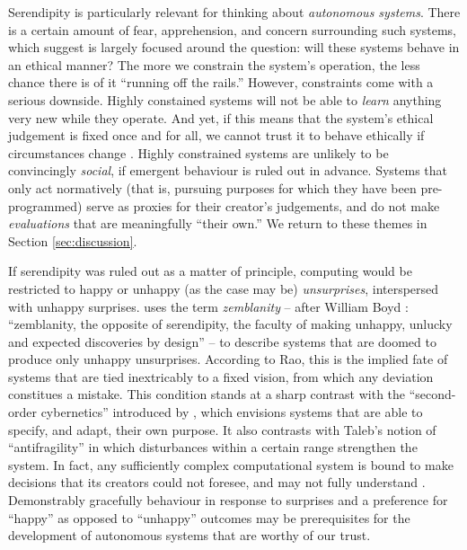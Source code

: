 Serendipity is particularly relevant for thinking about
\emph{autonomous systems}.  There is a certain amount of fear,
apprehension, and concern surrounding such systems, which
 suggest is largely focused around the
question: will these systems behave in an ethical manner?  The more we
constrain the system's operation, the less chance there is of it
``running off the rails.''  However, constraints come with a serious
downside.  Highly constained systems will not be able to \emph{learn}
anything very new while they operate.  And yet, if this means that the
system's ethical judgement is fixed once and for all, we cannot trust
it to behave ethically if circumstances change
\cite{powers2005deontological}.  Highly constrained systems are
unlikely to be convincingly \emph{social}, if emergent behaviour is
ruled out in advance.  Systems that only act normatively (that is,
pursuing purposes for which they have been pre-programmed) serve as
proxies for their creator's judgements, and do not make
\emph{evaluations} that are meaningfully ``their own.''  We return to these themes in Section \ref{sec:discussion}.

If serendipity was ruled out as a matter of principle, computing would
be restricted to happy or unhappy (as the case may be)
\emph{unsurprises}, interspersed with unhappy surprises.
 uses the term \emph{zemblanity} -- after
William Boyd \citeyearpar{boyd2010armadillo}: ``zemblanity, the
opposite of serendipity, the faculty of making unhappy, unlucky and
expected discoveries by design'' -- to describe systems that are
doomed to produce only unhappy unsurprises.  According to Rao,
this is the implied fate of
systems that are tied inextricably to a fixed vision, from which any
deviation constitues a mistake.  This condition stands at a sharp
contrast with the ``second-order cybernetics'' introduced by
, which envisions systems that are able to
specify, and adapt, their own purpose.  It also contrasts with Taleb's
\citeyearpar{taleb2012antifragile} notion of ``antifragility'' in
which disturbances within a certain range strengthen the system.  In
fact, any sufficiently complex computational system is bound to make
decisions that its creators could not foresee, and may not fully
understand \cite{minsky1967programming}.  Demonstrably gracefully
behaviour in response to surprises and a preference for ``happy'' as
opposed to ``unhappy'' outcomes may be prerequisites for the
development of autonomous systems that are worthy of our trust.


